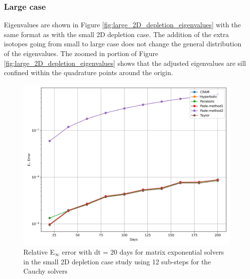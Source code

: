 \subsubsection{Large case}
Eigenvalues are shown in Figure \ref{fig:large_2D_depletion_eigenvalues} with the same format as with the small 2D depletion case. The addition of the extra isotopes going from small to large case does not change the general distribution of the eigenvalues. The zoomed in portion of Figure \ref{fig:large_2D_depletion_eigenvalues} shows that the adjusted eigenvalues are sill confined within the quadrature points around the origin. 

\clearpage

\begin{figure}[p]
    \centering
    \includegraphics[width=5in]{images/chapter-5/caseStudies/small2DDepletion/msrSmall2DDepletionEinfErrorerrorSteps12.png}
    \caption{Relative E$_{\infty}$ error with dt = 20 days for matrix exponential solvers in the small 2D depletion case study using 12 sub-steps for the Cauchy solvers}
    \label{fig:small_2D_depletion_Einf_steps12}
\end{figure}

\clearpage

